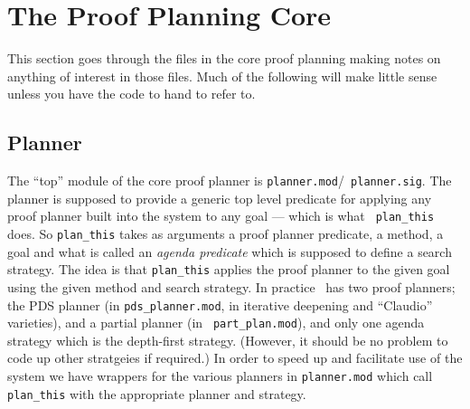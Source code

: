 \section{The Proof Planning Core}
This section goes through the files in the core proof planning making
notes on anything of interest in those files.  Much of the following
will make little sense unless you have the code to hand to refer to.

\subsection{Planner}
The ``top'' module of the core proof planner is {\tt planner.mod}/{\tt
  planner.sig}.  The planner is
supposed to provide a generic top level predicate for applying any
proof planner built into the system to any goal --- which is what {\tt
  plan\_this} does.  So {\tt plan\_this} takes as
arguments a proof planner predicate, a
method, a goal and what is called an {\em
  agenda predicate} which is supposed to
define a search strategy.  The idea is that
{\tt plan\_this} applies the proof planner to the given goal using the
given method and search strategy.  In practice \lclam\ has two proof
planners; the PDS planner (in {\tt pds\_planner.mod}, in iterative
deepening and ``Claudio'' varieties), and a partial planner (in {\tt
  part\_plan.mod}), and only one agenda strategy which is the
depth-first strategy.  (However, it should be no
problem to code up other stratgeies if required.)  In order to speed
up and facilitate use of the system we have wrappers for the various
planners in {\tt planner.mod} which call {\tt plan\_this} with the
appropriate planner and strategy.

